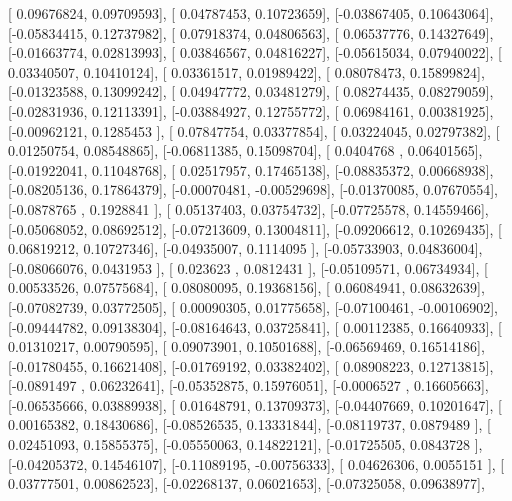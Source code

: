 \documentclass{article}
\begin{document}
       [ 0.09676824,  0.09709593],
       [ 0.04787453,  0.10723659],
       [-0.03867405,  0.10643064],
       [-0.05834415,  0.12737982],
       [ 0.07918374,  0.04806563],
       [ 0.06537776,  0.14327649],
       [-0.01663774,  0.02813993],
       [ 0.03846567,  0.04816227],
       [-0.05615034,  0.07940022],
       [ 0.03340507,  0.10410124],
       [ 0.03361517,  0.01989422],
       [ 0.08078473,  0.15899824],
       [-0.01323588,  0.13099242],
       [ 0.04947772,  0.03481279],
       [ 0.08274435,  0.08279059],
       [-0.02831936,  0.12113391],
       [-0.03884927,  0.12755772],
       [ 0.06984161,  0.00381925],
       [-0.00962121,  0.1285453 ],
       [ 0.07847754,  0.03377854],
       [ 0.03224045,  0.02797382],
       [ 0.01250754,  0.08548865],
       [-0.06811385,  0.15098704],
       [ 0.0404768 ,  0.06401565],
       [-0.01922041,  0.11048768],
       [ 0.02517957,  0.17465138],
       [-0.08835372,  0.00668938],
       [-0.08205136,  0.17864379],
       [-0.00070481, -0.00529698],
       [-0.01370085,  0.07670554],
       [-0.0878765 ,  0.1928841 ],
       [ 0.05137403,  0.03754732],
       [-0.07725578,  0.14559466],
       [-0.05068052,  0.08692512],
       [-0.07213609,  0.13004811],
       [-0.09206612,  0.10269435],
       [ 0.06819212,  0.10727346],
       [-0.04935007,  0.1114095 ],
       [-0.05733903,  0.04836004],
       [-0.08066076,  0.0431953 ],
       [ 0.023623  ,  0.0812431 ],
       [-0.05109571,  0.06734934],
       [ 0.00533526,  0.07575684],
       [ 0.08080095,  0.19368156],
       [ 0.06084941,  0.08632639],
       [-0.07082739,  0.03772505],
       [ 0.00090305,  0.01775658],
       [-0.07100461, -0.00106902],
       [-0.09444782,  0.09138304],
       [-0.08164643,  0.03725841],
       [ 0.00112385,  0.16640933],
       [ 0.01310217,  0.00790595],
       [ 0.09073901,  0.10501688],
       [-0.06569469,  0.16514186],
       [-0.01780455,  0.16621408],
       [-0.01769192,  0.03382402],
       [ 0.08908223,  0.12713815],
       [-0.0891497 ,  0.06232641],
       [-0.05352875,  0.15976051],
       [-0.0006527 ,  0.16605663],
       [-0.06535666,  0.03889938],
       [ 0.01648791,  0.13709373],
       [-0.04407669,  0.10201647],
       [ 0.00165382,  0.18430686],
       [-0.08526535,  0.13331844],
       [-0.08119737,  0.0879489 ],
       [ 0.02451093,  0.15855375],
       [-0.05550063,  0.14822121],
       [-0.01725505,  0.0843728 ],
       [-0.04205372,  0.14546107],
       [-0.11089195, -0.00756333],
       [ 0.04626306,  0.0055151 ],
       [ 0.03777501,  0.00862523],
       [-0.02268137,  0.06021653],
       [-0.07325058,  0.09638977],
\end{document}
